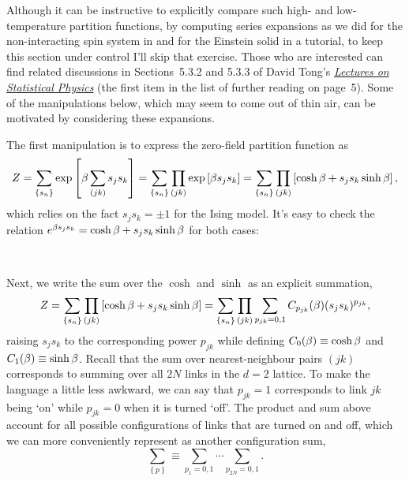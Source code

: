 Although it can be instructive to explicitly compare such high- and low-temperature partition functions, by computing series expansions as we did for the non-interacting spin system in  and for the Einstein solid in a tutorial, to keep this section under control I'll skip that exercise.
Those who are interested can find related discussions in Sections~5.3.2 and 5.3.3 of David Tong's \href{https://www.damtp.cam.ac.uk/user/tong/statphys.html}{\textit{Lectures on Statistical Physics}} (the first item in the list of further reading on page~5).
Some of the manipulations below, which may seem to come out of thin air, can be motivated by considering these expansions.

The first manipulation is to express the zero-field partition function as
\begin{equation*}
  Z = \sum_{\left\{s_n\right\}} \exp\left[\beta\sum_{(jk)} s_j s_k\right] = \sum_{\left\{s_n\right\}} \prod_{(jk)} \exp\left[\beta s_j s_k\right] = \sum_{\left\{s_n\right\}} \prod_{(jk)} \left[\cosh \beta + s_j s_k \sinh \beta\right],
\end{equation*}
which relies on the fact $s_j s_k = \pm 1$ for the Ising model.
It's easy to check the relation $e^{\beta s_j s_k} = \cosh \beta + s_j s_k \sinh \beta$ for both cases:
\begin{mdframed}
  \ \\[60 pt]
\end{mdframed}
Next, we write the sum over the $\cosh$ and $\sinh$ as an explicit summation,
\begin{equation*}
  Z = \sum_{\left\{s_n\right\}} \prod_{(jk)} \left[\cosh \beta + s_j s_k \sinh \beta\right] = \sum_{\left\{s_n\right\}} \prod_{(jk)} \sum_{p_{jk} = 0, 1} C_{p_{jk}}(\beta) (s_j s_k)^{p_{jk}},
\end{equation*}
raising $s_j s_k$ to the corresponding power $p_{jk}$ while defining $C_0(\beta) \equiv \cosh \beta$ and $C_1(\beta) \equiv \sinh \beta$.
Recall that the sum over nearest-neighbour pairs $(jk)$ corresponds to summing over all $2N$ links in the $d = 2$ lattice.
To make the language a little less awkward, we can say that $p_{jk} = 1$ corresponds to link $jk$ being `on' while $p_{jk} = 0$ when it is turned `off'.
The product and sum above account for all possible configurations of links that are turned on and off, which we can more conveniently represent as another configuration sum,
\begin{equation*}
  \sum_{\left\{p\right\}} \equiv \sum_{p_1 = 0, 1} \cdots \sum_{p_{2N} = 0, 1}.
\end{equation*}

